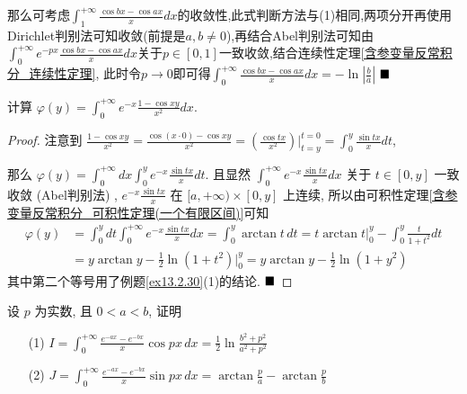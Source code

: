 \documentclass[lang=cn,newtx,10pt,scheme=chinese]{elegantbook}
\begin{document}
那么可考虑$\int_{1}^{+\infty}  \frac{\cos bx-\cos ax}{x}dx$的收敛性,此式判断方法与(1)相同,两项分开再使用Dirichlet判别法可知收敛(前提是$a,b \neq 0$),再结合Abel判别法可知由$\int_{0}^{+\infty} e^{-px} \frac{\cos bx - \cos ax}{x} dx$关于$p \in [0,1]$一致收敛,结合连续性定理\ref{含参变量反常积分_连续性定理},
此时令$ p \to 0 $即可得$\int_{0}^{+\infty} \frac{\cos bx - \cos ax}{x}dx = - \ln |\frac{b}{a}|$
$\hfill \blacksquare$


\begin{example}
计算 $\varphi(y)=\int_{0}^{+\infty}e^{-x}\frac{1-\cos xy}{x^2}dx$.
\end{example}

\begin{proof}
注意到 $\frac{1-\cos xy}{x^2} = \frac{\cos (x \cdot 0) - \cos xy}{x^2} = \left(\frac{\cos tx}{x^2}\right) \Big|_{t=y}^{t=0} = \int_{0}^{y} \frac{\sin tx}{x} dt $,

那么 $\varphi(y) = \int_{0}^{+\infty} dx \int_{0}^{y} e^{-x} \frac{\sin tx}{x} dt$.
且显然 $\int_{0}^{+\infty} e^{-x} \frac{\sin tx}{x} dx$ 关于 $t \in [0, y]$ 一致收敛 (Abel判别法) , $e^{-x} \frac{\sin tx}{x}$ 在 $[a, +\infty) \times [0, y]$ 上连续, 所以由可积性定理\ref{含参变量反常积分_可积性定理(一个有限区间)}可知
\begin{align*}
\varphi(y) &= \int_{0}^{y} dt \int_{0}^{+\infty} e^{-x} \frac{\sin tx}{x} dx = \int_{0}^{y} \arctan t \, dt = t \arctan t \Big|_{0}^{y} - \int_{0}^{y} \frac{t}{1+t^2} dt \\
&= y \arctan y - \frac{1}{2} \ln(1+t^2) \Big|_{0}^{y} = y \arctan y - \frac{1}{2} \ln(1+y^2)
\end{align*}
其中第二个等号用了例题\ref{ex13.2.30}(1)的结论.
$\hfill \blacksquare$
\end{proof}

\begin{example}\label{ex13.2.32}
设 $p$ 为实数, 且 $0<a<b$, 证明
\begin{enumerate}
    \item[(1)] $I = \int_{0}^{+\infty} \frac{e^{-ax}-e^{-bx}}{x} \cos px \, dx = \frac{1}{2} \ln \frac{b^2+p^2}{a^2+p^2}$
    \item[(2)] $J = \int_{0}^{+\infty} \frac{e^{-ax}-e^{-bx}}{x} \sin px \, dx = \arctan \frac{p}{a} - \arctan \frac{p}{b}$
\end{enumerate}
\end{example}
\end{document}
